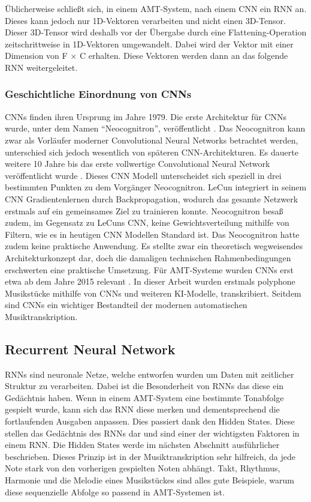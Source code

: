 Üblicherweise schließt sich, in einem AMT-System, nach einem CNN ein RNN an.
Dieses kann jedoch nur 1D-Vektoren verarbeiten und nicht einen 3D-Tensor.
Dieser 3D-Tensor wird deshalb vor der Übergabe durch eine Flattening-Operation
zeitschrittweise in 1D-Vektoren umgewandelt.
Dabei wird der Vektor mit einer Dimension von F × C erhalten.
Diese Vektoren werden dann an das folgende RNN weitergeleitet.

\subsubsection{Geschichtliche Einordnung von CNNs}
CNNs finden ihren Ursprung im Jahre 1979.
Die erste Architektur für CNNs wurde, unter dem Namen \enquote{Neocognitron}, veröffentlicht \cite{fukushima1980neocognitron}.
Das Neocognitron kann zwar als Vorläufer moderner Convolutional Neural Networks betrachtet werden,
unterschied sich jedoch wesentlich von späteren CNN-Architekturen.
Es dauerte weitere 10 Jahre bis das erste vollwertige Convolutional Neural Network veröffentlicht wurde \cite{lecun1989backpropagation}.
Dieses CNN Modell unterscheidet sich speziell in drei bestimmten Punkten zu dem Vorgänger Neocognitron.
LeCun integriert in seinem CNN Gradientenlernen durch Backpropagation,
wodurch das gesamte Netzwerk erstmals auf ein gemeinsames Ziel zu trainieren konnte.
Neocognitron besaß zudem, im Gegensatz zu LeCuns CNN,
keine Gewichtsverteilung mithilfe von Filtern, wie es in heutigen CNN Modellen Standard ist.
Das Neocognitron hatte zudem keine praktische Anwendung.
Es stellte zwar ein theoretisch wegweisendes Architekturkonzept dar,
doch die damaligen technischen Rahmenbedingungen erschwerten eine praktische Umsetzung.
Für AMT-Systeme wurden CNNs erst etwa ab dem Jahre 2015 relevant \cite{sigtia2016end}.
In dieser Arbeit wurden erstmals polyphone Musikstücke mithilfe von CNNs und weiteren KI-Modelle, transkribiert.
Seitdem sind CNNs ein wichtiger Bestandteil der modernen automatischen Musiktranskription.

\subsection{Recurrent Neural Network}
RNNs sind neuronale Netze, welche entworfen wurden um Daten mit zeitlicher Struktur zu verarbeiten.
Dabei ist die Besonderheit von RNNs das diese ein Gedächtnis haben.
Wenn in einem AMT-System eine bestimmte Tonabfolge gespielt wurde,
kann sich das RNN diese merken und dementsprechend die fortlaufenden Ausgaben anpassen.
Dies passiert dank den Hidden States.
Diese stellen das Gedächtnis des RNNs dar und sind einer der wichtigsten Faktoren in einem RNN\@.
Die Hidden States werde im nächsten Abschnitt ausführlicher beschrieben.
Dieses Prinzip ist in der Musiktranskription sehr hilfreich,
da jede Note stark von den vorherigen gespielten Noten abhängt.
Takt, Rhythmus, Harmonie und die Melodie eines Musikstückes sind alles gute Beispiele,
warum diese sequenzielle Abfolge so passend in AMT-Systemen ist.

